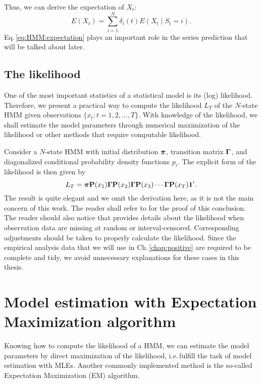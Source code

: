 Thus, we can derive the expectation of $X_t$:
		\begin{equation}
		\label{eq:HMM:expectation}
		E(X_t) = \sum_{i=1}^{N} \delta_i(t)E(X_t \mid S_t = i).
		\end{equation}
Eq.\,\ref{eq:HMM:expectation} plays an important role in 
the series prediction that will be talked about later.

\subsection{The likelihood}
\label{sec:HMM:overview:likelihood}
One of the most important statistics of a statistical model is its (log) likelihood.
Therefore, we present a practical way to compute the likelihood $L_T$
of the $N$-state HMM given observations $\{x_t \colon t = 1,2,\dots,T\}$.
With knowledge of the likelihood,
we shall estimate the model parameters through numerical maximization of the likelihood
or other methods that require computable likelihood.

Consider a $N$-state HMM with initial distribution ${\boldsymbol\pi}$, 
transition matrix ${\boldsymbol\Gamma}$,
and diagonalized conditional probability density functions $p_i$.
The explicit form of the likelihood is then given by
		\begin{equation}
		\label{eq:HMM:likelihood}
		L_T = {\boldsymbol\pi}{\mathbf P}(x_1){\boldsymbol\Gamma}{\mathbf P}(x_2){\boldsymbol\Gamma}{\mathbf P}(x_3)\cdots{\boldsymbol\Gamma}{\mathbf P}(x_T){\mathbf{1}^{\prime}}.
		\end{equation}
The result is quite elegant and we omit the derivation here,
as it is not the main concern of this work.
The reader shall refer to \cite{Zucchini:2009df} for the proof of this conclusion.
The reader should also notice that \cite{Zucchini:2009df} provides details about the likelihood
when observation data are missing at random or interval-censored.
Corresponding adjustments should be taken to properly calculate the likelihood.
Since the empirical analysis data that we will use in Ch.\,\ref{chap:positive} 
are required to be complete and tidy,
we avoid unnecessary explanations for these cases in this thesis.


\section{Model estimation with Expectation Maximization algorithm}
\label{sec:HMM:EM}
Knowing how to compute the likelihood of a HMM, 
we can estimate the model parameters by direct maximization of the likelihood,
i.e.\,fulfill the task of model estimation with MLEs.
Another commonly implemented method is the so-called Expectation Maximization (EM) algorithm.

